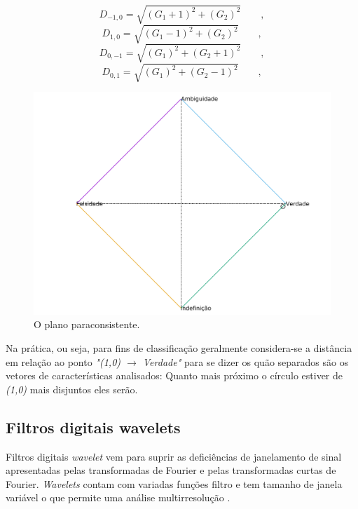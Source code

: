 			\begin{equation}
				D_{-1,0}=\sqrt{(G_1+1)^2+(G_2)^2}\qquad,
			\end{equation}
			\begin{equation}
				D_{1,0}=\sqrt{(G_1-1)^2+(G_2)^2}\qquad,
			\end{equation}
			\begin{equation}
				D_{0,-1}=\sqrt{(G_1)^2+(G_2+1)^2}\qquad,		
			\end{equation}
			\begin{equation}
				D_{0,1}=\sqrt{(G_1)^2+(G_2-1)^2}\qquad,
			\end{equation}		

			\begin{figure}[h]
				\centering
				\includegraphics[width=0.69\linewidth]{images/paraconsistentPlane.pdf}
				\caption{O plano paraconsistente.}
				\label{fig:paraconsistentplane}
			\end{figure}
		
		\par Na prática, ou seja, para fins de classificação geralmente considera-se a distância em relação ao ponto \textit{"(1,0) $\rightarrow$ Verdade"} para se dizer os quão separados são os vetores de características analisados: Quanto mais próximo o círculo estiver de \textit{(1,0)} mais disjuntos eles serão.

		\newpage
		\subsection{Filtros digitais wavelets}
			\par Filtros digitais \textit{wavelet} vem para suprir as deficiências de janelamento de sinal apresentadas pelas transformadas de Fourier e pelas transformadas curtas de Fourier. \textit{Wavelets} contam com variadas funções filtro e tem tamanho de janela variável o que permite uma análise multirresolução \cite{Rod5254905}.
			
